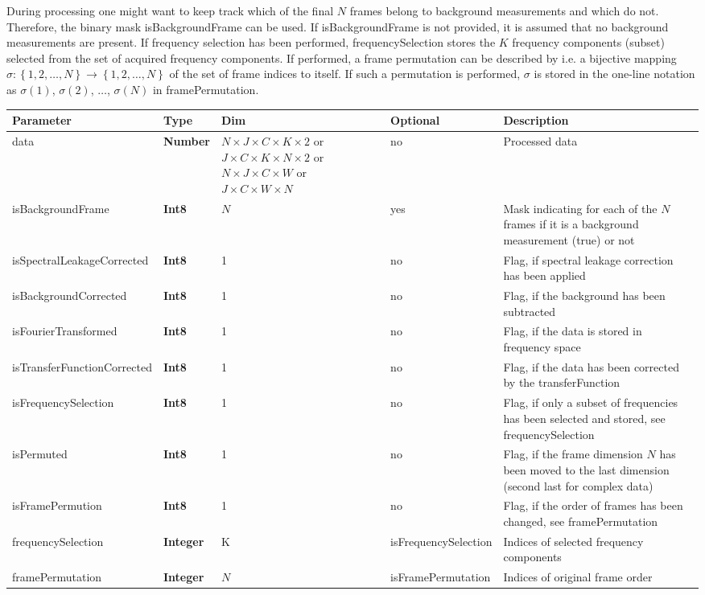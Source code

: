 \documentclass[landscape,a4paper]{article} %
\newcommand{\inltab}[1]{{\ttfamily\bfseries\color{blue}#1}}
\newcommand{\inlvar}[1]{{\ttfamily#1}}
\begin{document}
\begin{multicols}{2}
During processing one might want to keep track which of the final $N$ frames belong to background measurements and which do not. Therefore, the binary mask \inlvar{isBackgroundFrame} can be used. If \inlvar{isBackgroundFrame} is not provided, it is assumed that no background measurements are present. If frequency selection has been performed, \inlvar{frequencySelection} stores the $K$ frequency components (subset) selected from the set of acquired frequency components. If performed, a frame permutation can be described by i.e. a bijective mapping $\sigma : \left\{ 1,2,\dots,N \right\} \rightarrow \left\{ 1,2,\dots,N \right\}$ of the set of frame indices to itself. If such a permutation is performed, $\sigma$ is stored in the one-line notation as $\sigma(1)$, $\sigma(2)$, $\dots$, $\sigma(N)$ in \inlvar{framePermutation}.

\end{multicols}

\noindent \begin{tabularx}{\columnwidth}{llp{3cm}lX} 
\textbf{Parameter} & \textbf{Type} & \textbf{Dim} &  \textbf{Optional} & \textbf{Description} \\ \hline 
\inlvar{data} & \inltab{Number} & $N \times J \times C \times K\times 2$ or $ J \times C \times K\times N \times 2$ or $N \times J \times C \times W$ or $ J \times C \times W \times N$ & no & Processed data \\ \hline
\inlvar{isBackgroundFrame} & \inltab{Int8} & $N$ & yes & Mask indicating for each of the $N$ frames if it is a background measurement (true) or not \\ \hline
\inlvar{isSpectralLeakageCorrected} & \inltab{Int8} & 1 & no & Flag, if spectral leakage correction has been applied \\ \hline
\inlvar{isBackgroundCorrected} & \inltab{Int8} & 1 & no & Flag, if the background has been subtracted \\ \hline
\inlvar{isFourierTransformed} & \inltab{Int8} & 1 & no & Flag, if the data is stored in frequency space \\ \hline
\inlvar{isTransferFunctionCorrected} & \inltab{Int8} & 1 & no & Flag, if the data has been corrected by the \inlvar{transferFunction}\\ \hline 
\inlvar{isFrequencySelection} & \inltab{Int8} & 1 & no & Flag, if only a subset of frequencies has been selected and stored, see \inlvar{frequencySelection}\\ \hline 
\inlvar{isPermuted} & \inltab{Int8} & 1 & no & Flag, if the frame dimension $N$ has been moved to the last dimension (second last for complex data) \\ \hline
\inlvar{isFramePermution} & \inltab{Int8} & 1 & no & Flag, if the order of frames has been changed, see \inlvar{framePermutation} \\ \hline 
\inlvar{frequencySelection} & \inltab{Integer} & K & \inlvar{isFrequencySelection} & Indices of selected frequency components \\ \hline
\inlvar{framePermutation} & \inltab{Integer} & $N$ & \inlvar{isFramePermutation} & Indices of original frame order\\ \hline
\end{tabularx} 
\end{document}
